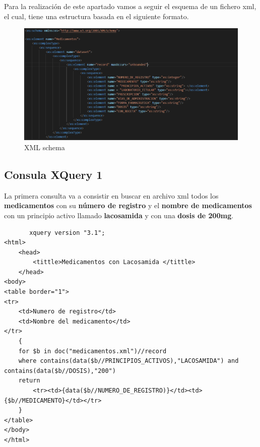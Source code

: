 \documentclass[../main.tex]{subfiles}
\begin{document}
Para la realización de este apartado vamos a seguir el esquema de un fichero xml, el cual, tiene una estructura basada en el siguiente formato. 

\begin{figure}[h]
    \centering
    \includegraphics[scale=0.8]{images/schema.PNG}
    \caption{XML schema}
    \label{fig:mesh1}
\end{figure}




\subsection{Consula XQuery 1}

La primera consulta va a consistir en buscar en archivo xml todos los \textbf{medicamentos} con su \textbf{número de registro} y el \textbf{nombre de medicamentos} con un principio activo llamado \textbf{lacosamida} y con una \textbf{dosis de 200mg}. 

\lstset{language=HTML}
\begin{lstlisting}
       xquery version "3.1";
<html>
    <head>
        <tittle>Medicamentos con Lacosamida </tittle>
    </head>
<body>
<table border="1">
<tr>
    <td>Numero de registro</td>
    <td>Nombre del medicamento</td>
</tr>
    {
    for $b in doc("medicamentos.xml")//record
    where contains(data($b//PRINCIPIOS_ACTIVOS),"LACOSAMIDA") and contains(data($b//DOSIS),"200")
    return 
        <tr><td>{data($b//NUMERO_DE_REGISTRO)}</td><td>{$b//MEDICAMENTO}</td></tr>
    }
</table>
</body>
</html>
\end{lstlisting}
\end{document}
